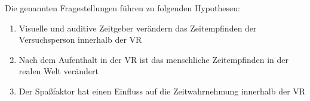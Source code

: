 \documentclass{Paper}
\begin{document}








 Die genannten Fragestellungen führen zu folgenden Hypothesen:
 
\begin{enumerate}
\item Visuelle und auditive Zeitgeber verändern das Zeitempfinden der Versuchsperson innerhalb der VR

\item Nach dem Aufenthalt in der VR ist das menschliche Zeitempfinden in der realen Welt verändert


\item Der Spaßfaktor hat einen Einfluss auf die Zeitwahrnehmung innerhalb der VR
\end{enumerate}
\end{document}
